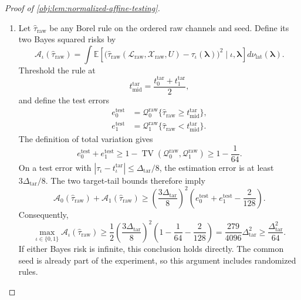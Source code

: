 \documentclass[11pt]{article}
\begin{document}
\begin{proof}[Proof of \cref{obj:lem:normalized-affine-testing}]
\begin{enumerate}
The required exponential comparison follows from
\[
2^{50}\le e^{\ell_{\mathrm{plain}}/4},
\qquad
\frac{\ell_{\mathrm{plain}}}{4}
\le e^{\ell_{\mathrm{plain}}/4}.
\]
The first uses \(e>2\) and
\(50\le\ell_{\mathrm{plain}}/4\); the second follows from
\(1+t\le e^t\). Multiplying gives
\[
e^{\ell_{\mathrm{plain}}/2}
\ge2^{48}\ell_{\mathrm{plain}}
\ge180\cdot2^{30}\ell_{\mathrm{plain}}.
\]
Since \(\sqrt S=e^{\ell_{\mathrm{plain}}/2}\),
\[
K_*\ge10\cdot2^{30}\ell_{\mathrm{plain}}L.
\]
Finally,
\[
1\le\ell_{\mathrm{plain}}L,\qquad
\epsilon^2L^2\le\frac{L^2}{16}
\le\frac{10}{16}\ell_{\mathrm{plain}}L,
\]
so
\[
1+\epsilon^2L^2\le10\ell_{\mathrm{plain}}L,
\qquad
K_*\ge2^{30}(1+\epsilon^2L^2).
\]
Substituting into the preceding tail bound proves, for both hypotheses,
\[
\nu_{\mathrm{lat}}\left\{
|\tau_\iota-t_\iota^{\mathrm{tar}}|
\ge\frac{\Delta_{\mathrm{tar}}}{8}\right\}
\le\frac1{128}.
\]

\item
Let \(\widehat\tau_{\mathrm{raw}}\) be any Borel rule on the ordered raw channels and seed. Define its two Bayes squared risks by
\[
\mathcal A_\iota(\widehat\tau_{\mathrm{raw}})
=
\int
\mathbb E\left[
\bigl(\widehat\tau_{\mathrm{raw}}
(\mathcal L_{\mathrm{raw}},\mathcal X_{\mathrm{raw}},U)
-\tau_\iota(\boldsymbol\lambda)\bigr)^2
\mid\iota,\boldsymbol\lambda
\right]d\nu_{\mathrm{lat}}(\boldsymbol\lambda).
\]
Threshold the rule at
\[
t_{\mathrm{mid}}^{\mathrm{tar}}
=\frac{t_0^{\mathrm{tar}}+t_1^{\mathrm{tar}}}{2},
\]
and define the test errors
\[
\begin{aligned}
e_0^{\mathrm{test}}
&=\mathcal Q_0^{\mathrm{raw}}
  \{\widehat\tau_{\mathrm{raw}}\ge t_{\mathrm{mid}}^{\mathrm{tar}}\},\\
e_1^{\mathrm{test}}
&=\mathcal Q_1^{\mathrm{raw}}
  \{\widehat\tau_{\mathrm{raw}}<t_{\mathrm{mid}}^{\mathrm{tar}}\}.
\end{aligned}
\]
The definition of total variation gives
\[
e_0^{\mathrm{test}}+e_1^{\mathrm{test}}
\ge1-\operatorname{TV}(\mathcal Q_0^{\mathrm{raw}},
                       \mathcal Q_1^{\mathrm{raw}})
\ge1-\frac1{64}.
\]
On a test error with
\(|\tau_\iota-t_\iota^{\mathrm{tar}}|\le\Delta_{\mathrm{tar}}/8\),
the estimation error is at least \(3\Delta_{\mathrm{tar}}/8\). The two target-tail bounds therefore imply
\[
\mathcal A_0(\widehat\tau_{\mathrm{raw}})
+\mathcal A_1(\widehat\tau_{\mathrm{raw}})
\ge
\left(\frac{3\Delta_{\mathrm{tar}}}{8}\right)^2
\left(e_0^{\mathrm{test}}+e_1^{\mathrm{test}}-\frac2{128}\right).
\]
Consequently,
\[
\max_{\iota\in\{0,1\}}\mathcal A_\iota(\widehat\tau_{\mathrm{raw}})
\ge
\frac12\left(\frac{3\Delta_{\mathrm{tar}}}{8}\right)^2
\left(1-\frac1{64}-\frac2{128}\right)
=\frac{279}{4096}\Delta_{\mathrm{tar}}^2
\ge\frac{\Delta_{\mathrm{tar}}^2}{64}.
\]
If either Bayes risk is infinite, this conclusion holds directly. The common seed is already part of the experiment, so this argument includes randomized rules.


\end{enumerate}
\end{proof}
\end{document}
